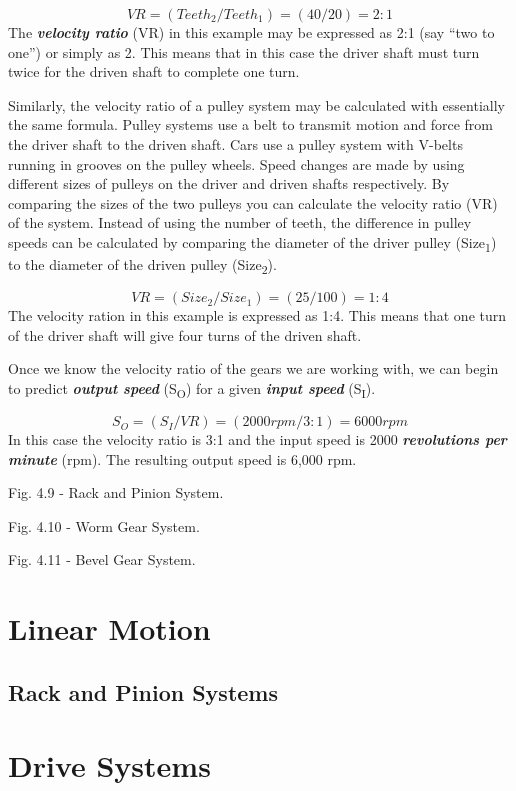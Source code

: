 \documentclass[
]{book}
\begin{document}
\[VR = (Teeth_2/Teeth_1) = (40/20) = 2:1\]
The \textbf{\emph{velocity ratio}} (VR) in this example may be expressed as 2:1 (say ``two to one'') or simply as 2. This means that in this case the driver shaft must turn twice for the driven shaft to complete one turn.

Similarly, the velocity ratio of a pulley system may be calculated with essentially the same formula. Pulley systems use a belt to transmit motion and force from the driver shaft to the driven shaft. Cars use a pulley system with V-belts running in grooves on the pulley wheels. Speed changes are made by using different sizes of pulleys on the driver and driven shafts respectively. By comparing the sizes of the two pulleys you can calculate the velocity ratio (VR) of the system. Instead of using the number of teeth, the difference in pulley speeds can be calculated by comparing the diameter of the driver pulley (Size\textsubscript{1}) to the diameter of the driven pulley (Size\textsubscript{2}).

\[VR = (Size_2/Size_1)=(25/100)=1:4\]
The velocity ration in this example is expressed as 1:4. This means that one turn of the driver shaft will give four turns of the driven shaft.

Once we know the velocity ratio of the gears we are working with, we can begin to predict \textbf{\emph{output speed}} (S\textsubscript{O}) for a given \textbf{\emph{input speed}} (S\textsubscript{I}).

\[S_O=(S_I/VR)=(2000rpm/3:1)=6000rpm\]
In this case the velocity ratio is 3:1 and the input speed is 2000 \textbf{\emph{revolutions per minute}} (rpm). The resulting output speed is 6,000 rpm.

Fig. 4.9 - Rack and Pinion System.

Fig. 4.10 - Worm Gear System.

Fig. 4.11 - Bevel Gear System.

\hypertarget{linear-motion}{%
\section{Linear Motion}\label{linear-motion}}

\hypertarget{rack-and-pinion-systems}{%
\subsection{Rack and Pinion Systems}\label{rack-and-pinion-systems}}

\hypertarget{drive-systems}{%
\section{Drive Systems}\label{drive-systems}}
\end{document}
